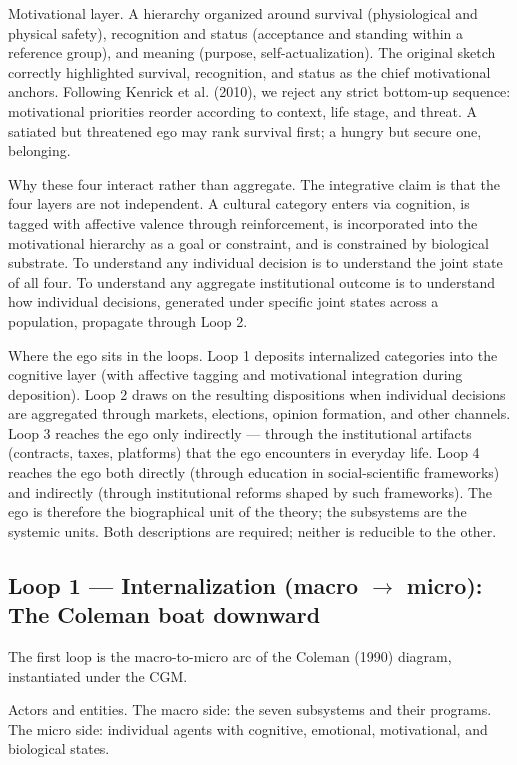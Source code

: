 \documentclass[12pt,a4paper]{article}
\begin{document}
Motivational layer. A hierarchy organized around survival (physiological and physical safety), recognition and status (acceptance and standing within a reference group), and meaning (purpose, self-actualization). The original sketch correctly highlighted survival, recognition, and status as the chief motivational anchors. Following Kenrick et al. (2010), we reject any strict bottom-up sequence: motivational priorities reorder according to context, life stage, and threat. A satiated but threatened ego may rank survival first; a hungry but secure one, belonging.


Why these four interact rather than aggregate. The integrative claim is that the four layers are not independent. A cultural category enters via cognition, is tagged with affective valence through reinforcement, is incorporated into the motivational hierarchy as a goal or constraint, and is constrained by biological substrate. To understand any individual decision is to understand the joint state of all four. To understand any aggregate institutional outcome is to understand how individual decisions, generated under specific joint states across a population, propagate through Loop 2.


Where the ego sits in the loops. Loop 1 deposits internalized categories into the cognitive layer (with affective tagging and motivational integration during deposition). Loop 2 draws on the resulting dispositions when individual decisions are aggregated through markets, elections, opinion formation, and other channels. Loop 3 reaches the ego only indirectly --- through the institutional artifacts (contracts, taxes, platforms) that the ego encounters in everyday life. Loop 4 reaches the ego both directly (through education in social-scientific frameworks) and indirectly (through institutional reforms shaped by such frameworks). The ego is therefore the biographical unit of the theory; the subsystems are the systemic units. Both descriptions are required; neither is reducible to the other.

\subsection{Loop 1 --- Internalization (macro $\rightarrow$ micro): The Coleman boat downward}

The first loop is the macro-to-micro arc of the Coleman (1990) diagram, instantiated under the CGM.


Actors and entities. The macro side: the seven subsystems and their programs. The micro side: individual agents with cognitive, emotional, motivational, and biological states.
\end{document}
